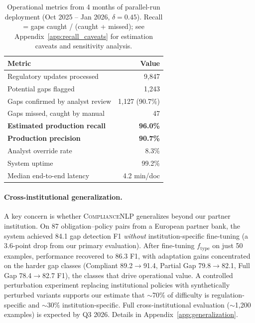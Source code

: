 \documentclass[11pt]{article}
\begin{document}
\begin{table}[t]
\centering
\small
\setlength{\tabcolsep}{2pt}
\begin{tabular}{@{}p{5.2cm}r@{}}
\toprule
\textbf{Metric} & \textbf{Value} \\
\midrule
Regulatory updates processed & 9{,}847 \\
Potential gaps flagged & 1{,}243 \\
Gaps confirmed by analyst review & 1{,}127 (90.7\%) \\
Gaps missed, caught by manual & 47 \\
\textbf{Estimated production recall} & \textbf{96.0\%} \\
\textbf{Production precision} & \textbf{90.7\%} \\
Analyst override rate & 8.3\% \\
System uptime & 99.2\% \\
Median end-to-end latency & 4.2 min/doc \\
\bottomrule
\end{tabular}
\caption{Operational metrics from 4 months of parallel-run deployment (Oct 2025 -- Jan 2026, $\delta{=}0.45$). Recall = gaps caught / (caught + missed); see Appendix~\ref{app:recall_caveats} for estimation caveats and sensitivity analysis.}
\label{tab:production}
\end{table}

\paragraph{Cross-institutional generalization.} A key concern is whether \textsc{ComplianceNLP} generalizes beyond our partner institution. On 87 obligation--policy pairs from a European partner bank, the system achieved 84.1 gap detection F1 \emph{without} institution-specific fine-tuning (a 3.6-point drop from our primary evaluation). After fine-tuning $f_{\text{type}}$ on just 50 examples, performance recovered to 86.3 F1, with adaptation gains concentrated on the harder gap classes (Compliant 89.2$\to$91.4, Partial Gap 79.8$\to$82.1, Full Gap 78.4$\to$82.7 F1), the classes that drive operational value. A controlled perturbation experiment replacing institutional policies with synthetically perturbed variants supports our estimate that $\sim$70\% of difficulty is regulation-specific and $\sim$30\% institution-specific. Full cross-institutional evaluation ($\sim$1{,}200 examples) is expected by Q3 2026. Details in Appendix~\ref{app:generalization}.
\end{document}
